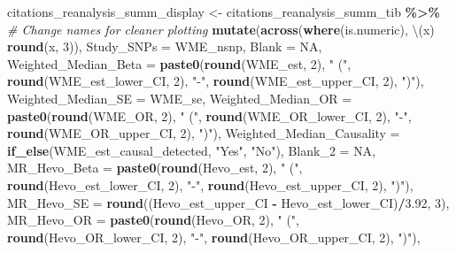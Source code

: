 \documentclass[
]{article}
\newenvironment{Shaded}{\begin{snugshade}}{\end{snugshade}}
\newcommand{\AttributeTok}[1]{\textcolor[rgb]{0.13,0.29,0.53}{#1}}
\newcommand{\CommentTok}[1]{\textcolor[rgb]{0.56,0.35,0.01}{\textit{#1}}}
\newcommand{\ConstantTok}[1]{\textcolor[rgb]{0.56,0.35,0.01}{#1}}
\newcommand{\DecValTok}[1]{\textcolor[rgb]{0.00,0.00,0.81}{#1}}
\newcommand{\FloatTok}[1]{\textcolor[rgb]{0.00,0.00,0.81}{#1}}
\newcommand{\FunctionTok}[1]{\textcolor[rgb]{0.13,0.29,0.53}{\textbf{#1}}}
\newcommand{\NormalTok}[1]{#1}
\newcommand{\OtherTok}[1]{\textcolor[rgb]{0.56,0.35,0.01}{#1}}
\newcommand{\SpecialCharTok}[1]{\textcolor[rgb]{0.81,0.36,0.00}{\textbf{#1}}}
\newcommand{\StringTok}[1]{\textcolor[rgb]{0.31,0.60,0.02}{#1}}
\begin{document}
\begin{landscape}

\begin{Shaded}
\begin{Highlighting}[]
\NormalTok{citations\_reanalysis\_summ\_display }\OtherTok{\textless{}{-}}\NormalTok{ citations\_reanalysis\_summ\_tib }\SpecialCharTok{\%\textgreater{}\%}
  \CommentTok{\# Change names for cleaner plotting}
  \FunctionTok{mutate}\NormalTok{(}\FunctionTok{across}\NormalTok{(}\FunctionTok{where}\NormalTok{(is.numeric), \textbackslash{}(x) }\FunctionTok{round}\NormalTok{(x, }\DecValTok{3}\NormalTok{)), }
         \AttributeTok{Study\_SNPs =}\NormalTok{ WME\_nsnp,}
         \AttributeTok{Blank =} \ConstantTok{NA}\NormalTok{,}
         \AttributeTok{Weighted\_Median\_Beta =} \FunctionTok{paste0}\NormalTok{(}\FunctionTok{round}\NormalTok{(WME\_est, }\DecValTok{2}\NormalTok{), }\StringTok{" ("}\NormalTok{, }\FunctionTok{round}\NormalTok{(WME\_est\_lower\_CI, }\DecValTok{2}\NormalTok{), }\StringTok{"{-}"}\NormalTok{, }\FunctionTok{round}\NormalTok{(WME\_est\_upper\_CI, }\DecValTok{2}\NormalTok{), }\StringTok{")"}\NormalTok{),}
         \AttributeTok{Weighted\_Median\_SE =}\NormalTok{ WME\_se,}
         \AttributeTok{Weighted\_Median\_OR =} \FunctionTok{paste0}\NormalTok{(}\FunctionTok{round}\NormalTok{(WME\_OR, }\DecValTok{2}\NormalTok{), }\StringTok{" ("}\NormalTok{, }\FunctionTok{round}\NormalTok{(WME\_OR\_lower\_CI, }\DecValTok{2}\NormalTok{), }\StringTok{"{-}"}\NormalTok{, }\FunctionTok{round}\NormalTok{(WME\_OR\_upper\_CI, }\DecValTok{2}\NormalTok{), }\StringTok{")"}\NormalTok{),}
         \AttributeTok{Weighted\_Median\_Causality =} \FunctionTok{if\_else}\NormalTok{(WME\_est\_causal\_detected, }\StringTok{"Yes"}\NormalTok{, }\StringTok{"No"}\NormalTok{),}
         \AttributeTok{Blank\_2 =} \ConstantTok{NA}\NormalTok{,}
         \AttributeTok{MR\_Hevo\_Beta =} \FunctionTok{paste0}\NormalTok{(}\FunctionTok{round}\NormalTok{(Hevo\_est, }\DecValTok{2}\NormalTok{), }\StringTok{" ("}\NormalTok{, }\FunctionTok{round}\NormalTok{(Hevo\_est\_lower\_CI, }\DecValTok{2}\NormalTok{), }\StringTok{"{-}"}\NormalTok{, }\FunctionTok{round}\NormalTok{(Hevo\_est\_upper\_CI, }\DecValTok{2}\NormalTok{), }\StringTok{")"}\NormalTok{),}
         \AttributeTok{MR\_Hevo\_SE =} \FunctionTok{round}\NormalTok{((Hevo\_est\_upper\_CI }\SpecialCharTok{{-}}\NormalTok{ Hevo\_est\_lower\_CI)}\SpecialCharTok{/}\FloatTok{3.92}\NormalTok{, }\DecValTok{3}\NormalTok{),}
         \AttributeTok{MR\_Hevo\_OR =} \FunctionTok{paste0}\NormalTok{(}\FunctionTok{round}\NormalTok{(Hevo\_OR, }\DecValTok{2}\NormalTok{), }\StringTok{" ("}\NormalTok{, }\FunctionTok{round}\NormalTok{(Hevo\_OR\_lower\_CI, }\DecValTok{2}\NormalTok{), }\StringTok{"{-}"}\NormalTok{, }\FunctionTok{round}\NormalTok{(Hevo\_OR\_upper\_CI, }\DecValTok{2}\NormalTok{), }\StringTok{")"}\NormalTok{),}

\end{Highlighting}
\end{Shaded}
\end{landscape}
\end{document}
